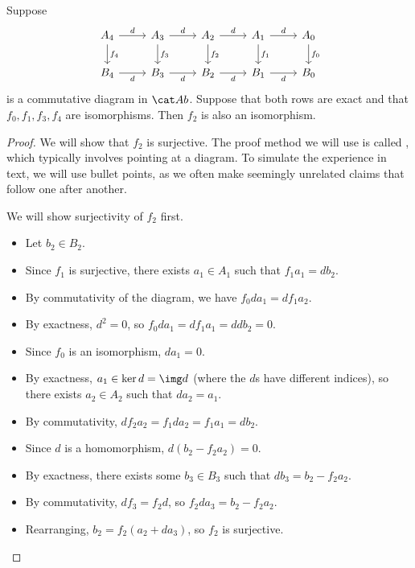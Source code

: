 \documentclass{standalone}
\begin{document}
\begin{theorem}
  Suppose
  \[
    \begin{tikzcd}
    	A_4 \ar[r, "d"] \ar[d, "f_4"] &
        A_3 \ar[r, "d"] \ar[d, "f_3"] &
        A_2 \ar[r, "d"] \ar[d, "f_2"] &
        A_1 \ar[r, "d"] \ar[d, "f_1"] &
        A_0             \ar[d, "f_0"] \\
    	B_4   \ar[r, "d", swap] &
        B_3 \ar[r, "d", swap] &
        B_2 \ar[r, "d", swap] &
        B_1 \ar[r, "d", swap] &
        B_0
    \end{tikzcd}
  \]
  is a commutative diagram in \(\cAb\). Suppose that both rows are exact
  and that \(f_0, f_1, f_3, f_4\) are isomorphisms.
  Then \(f_2\) is also an isomorphism.
\end{theorem}
\begin{proof}
  We will show that \(f_2\) is surjective. The proof method we will use
  is called , which typically involves pointing at
  a diagram. To simulate the experience in text, we will use bullet points,
  as we often make seemingly unrelated claims that follow one after another.

  We will show surjectivity of \(f_2\) first.
  \begin{itemize}[nosep]
    \item Let \(b_2 \in B_2\).
    \item Since \(f_1\) is surjective, there exists \(a_1 \in A_1\) such that
    \(f_1 a_1 = d b_2\).
    \item By commutativity of the diagram, we have \(f_0 d a_1 = d f_1 a_2\).
    \item By exactness, \(d^2 = 0\), so \(f_0 d a_1 = d f_1 a_1 = ddb_2 = 0\).
    \item Since \(f_0\) is an isomorphism, \(d a_1 = 0\).
    \item By exactness, \(a_1 \in \ker d = \img d\)
    (where the \(d\)s have different indices),
    so there exists \(a_2 \in A_2\) such that \(d a_2 = a_1\).
    \item By commutativity, \(d f_2 a_2 = f_1 d a_2 = f_1 a_1 = d b_2\).
    \item Since \(d\) is a homomorphism, \(d(b_2 - f_2 a_2) = 0\).
    \item By exactness, there exists some \(b_3 \in B_3\) such that
    \(d b_3 = b_2 - f_2 a_2\).
    \item By commutativity, \(d f_3 = f_2 d\), so
    \(f_2 d a_3 = b_2 - f_2 a_2\).
    \item Rearranging, \(b_2 = f_2(a_2 + da_3)\), so \(f_2\) is surjective.
  \end{itemize}


\end{proof}
\end{document}
